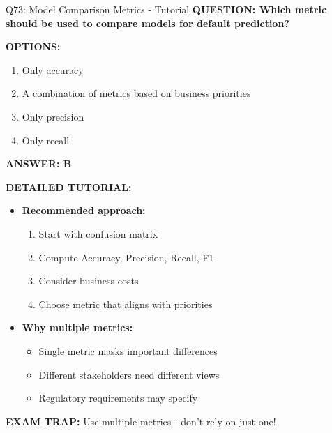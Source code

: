 \documentclass[8pt]{beamer}
\begin{document}
	\begin{frame}{Q73: Model Comparison Metrics - Tutorial}
		\fontsize{6.5}{7.5}\selectfont
		\textbf{QUESTION: Which metric should be used to compare models for default prediction?}
		
		\vspace{0.1cm}
		\textbf{OPTIONS:}
		\begin{enumerate}
			\item Only accuracy
			\item A combination of metrics based on business priorities
			\item Only precision
			\item Only recall
		\end{enumerate}
		
		\vspace{0.1cm}
		\textcolor{myblue}{\textbf{ANSWER: B}}
		
		\vspace{0.1cm}
		\textbf{DETAILED TUTORIAL:}
		\begin{itemize}
			\item \textbf{Recommended approach:}
			\begin{enumerate}
				\item Start with confusion matrix
				\item Compute Accuracy, Precision, Recall, F1
				\item Consider business costs
				\item Choose metric that aligns with priorities
			\end{enumerate}
			\item \textbf{Why multiple metrics:}
			\begin{itemize}
				\item Single metric masks important differences
				\item Different stakeholders need different views
				\item Regulatory requirements may specify
			\end{itemize}
		\end{itemize}
		
		\textcolor{myred}{\textbf{EXAM TRAP:}} Use \textcolor{myblue}{multiple metrics} - don't rely on just one!
	\end{frame}
	
\end{document}

